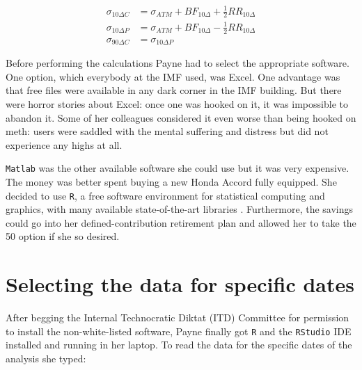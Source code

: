 \documentclass[]{book}
\theoremstyle{definition}
\theoremstyle{definition}
\theoremstyle{definition}
\theoremstyle{remark}
\begin{document}
\[
\begin{aligned}
  \sigma_{10\Delta C} &= \sigma_{ATM} + BF_{10\Delta} + \frac{1}{2} RR_{10\Delta}\\
  \sigma_{10\Delta P} &= \sigma_{ATM} + BF_{10\Delta} - \frac{1}{2} RR_{10\Delta}\\
  \sigma_{90\Delta C} &= \sigma_{10\Delta P}
\end{aligned}
\]

Before performing the calculations Payne had to select the appropriate
software. One option, which everybody at the IMF used, was Excel. One
advantage was that free files were available in any dark corner in the
IMF building. But there were horror stories about Excel: once one was
hooked on it, it was impossible to abandon it. Some of her colleagues
considered it even worse than being hooked on meth: users were saddled
with the mental suffering and distress but did not experience any highs
at all.

\texttt{Matlab} was the other available software she could use but it
was very expensive. The money was better spent buying a new Honda Accord
fully equipped. She decided to use \texttt{R}, a free software
environment for statistical computing and graphics, with many available
state-of-the-art libraries \citep{R-base}. Furthermore, the savings
could go into her defined-contribution retirement plan and allowed her
to take the 50 option if she so desired.

\section{Selecting the data for specific
dates}\label{selecting-the-data-for-specific-dates}

After begging the Internal Technocratic Diktat (ITD) Committee for
permission to install the non-white-listed software, Payne finally got
\texttt{R} and the \texttt{RStudio} IDE installed and running in her
laptop. To read the data for the specific dates of the analysis she
typed:
\end{document}
